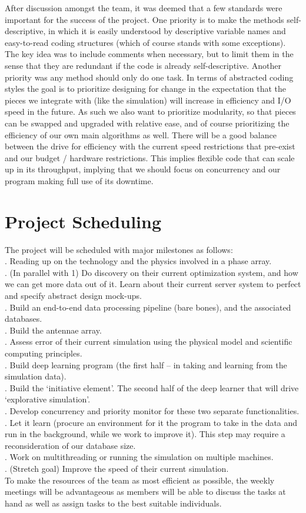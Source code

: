 \documentclass[12pt,a4]{report}
\begin{document}
After discussion amongst the team, it was deemed that a few standards were important for the success of the project. One priority is to make the methods self-descriptive, in which it is easily understood by descriptive variable names and easy-to-read coding structures (which of course stands with some exceptions). The key idea was to include comments when necessary, but to limit them in the sense that they are redundant if the code is already self-descriptive. Another priority was any method should only do one task. In terms of abstracted coding styles the goal is to prioritize designing for change in the expectation that the pieces we integrate with (like the simulation) will increase in efficiency and I/O speed in the future. As such we also want to prioritize modularity, so that pieces can be swapped and upgraded with relative ease, and of course prioritizing the efficiency of our own main algorithms as well. There will be a good balance between the drive for efficiency with the current speed restrictions that pre-exist and our budget / hardware restrictions. This implies flexible code that can scale up in its throughput, implying that we should focus on concurrency and our program making full use of its downtime.

\section*{Project Scheduling}
The project will be scheduled with major milestones as follows:\\

.	Reading up on the technology and the physics involved in a phase array.\\
.	(In parallel with 1) Do discovery on their current optimization system, and how we can get more data out of it. Learn about their current server system to perfect and specify abstract design mock-ups.\\
.	Build an end-to-end data processing pipeline (bare bones), and the associated databases.\\
.	Build the antennae array.\\
.	Assess error of their current simulation using the physical model and scientific computing principles.\\
.	Build deep learning program (the first half – in taking and learning from the simulation data).\\
.	Build the ‘initiative element’. The second half of the deep learner that will drive ‘explorative simulation’. \\
.	Develop concurrency and priority monitor for these two separate functionalities.\\
.	Let it learn (procure an environment for it the program to take in the data and run in the background, while we work to improve it). This step may require a reconsideration of our database size.\\
.	Work on multithreading or running the simulation on multiple machines.\\
.	(Stretch goal) Improve the speed of their current simulation.\\

To make the resources of the team as most efficient as possible, the weekly meetings will be advantageous as members will be able to discuss the tasks at hand as well as assign tasks to the best suitable individuals. 
\end{document}
